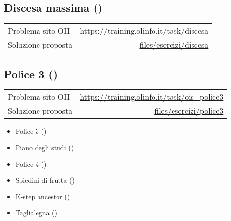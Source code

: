 \subsection{Discesa massima {()}}
\begin{center}
	\begin{tabularx}{\textwidth}{X r}
		\toprule
		Problema sito OII  & \url{https://training.olinfo.it/task/discesa}                         \\
		Soluzione proposta & \ttfamily\href{run:./files/esercizi/discesa/}{files/esercizi/discesa} \\
		\bottomrule
	\end{tabularx}
\end{center}

\subsection{Police 3 {()}}
\begin{center}
	\begin{tabularx}{\textwidth}{X r}
		\toprule
		Problema sito OII  & \url{https://training.olinfo.it/task/ois_police3}                     \\
		Soluzione proposta & \ttfamily\href{run:./files/esercizi/discesa/}{files/esercizi/police3} \\
		\bottomrule
	\end{tabularx}
\end{center}


\begin{itemize}
	\item Police 3 ()
	\item Piano degli studi ()
	\item Police 4 ()
	\item Spiedini di frutta ()
	\item K-step ancestor ()
	\item Taglialegna ()
\end{itemize}




